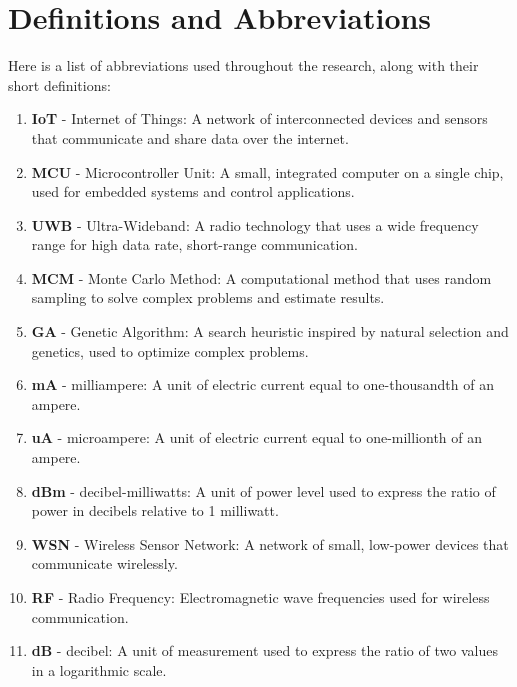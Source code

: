 \chapter*{Definitions and Abbreviations}\label{chap:additional_chapters}


Here is a list of abbreviations used throughout the research, along with their short definitions:

\vspace{2mm}
\begin{enumerate}
    \item \textbf{IoT} - Internet of Things: A network of interconnected devices and sensors that communicate and share data over the internet.
    \item \textbf{MCU} - Microcontroller Unit: A small, integrated computer on a single chip, used for embedded systems and control applications.
    \item \textbf{UWB} - Ultra-Wideband: A radio technology that uses a wide frequency range for high data rate, short-range communication.
    \item \textbf{MCM} - Monte Carlo Method: A computational method that uses random sampling to solve complex problems and estimate results.
    \item \textbf{GA} - Genetic Algorithm: A search heuristic inspired by natural selection and genetics, used to optimize complex problems.
    \item \textbf{mA} - milliampere: A unit of electric current equal to one-thousandth of an ampere.
    \item \textbf{uA} - microampere: A unit of electric current equal to one-millionth of an ampere.
    \item \textbf{dBm} - decibel-milliwatts: A unit of power level used to express the ratio of power in decibels relative to 1 milliwatt.
    \item \textbf{WSN} - Wireless Sensor Network: A network of small, low-power devices that communicate wirelessly.
    \item \textbf{RF} - Radio Frequency: Electromagnetic wave frequencies used for wireless communication.
    \item \textbf{dB} - decibel: A unit of measurement used to express the ratio of two values in a logarithmic scale.
\end{enumerate}
\vspace{3mm}
